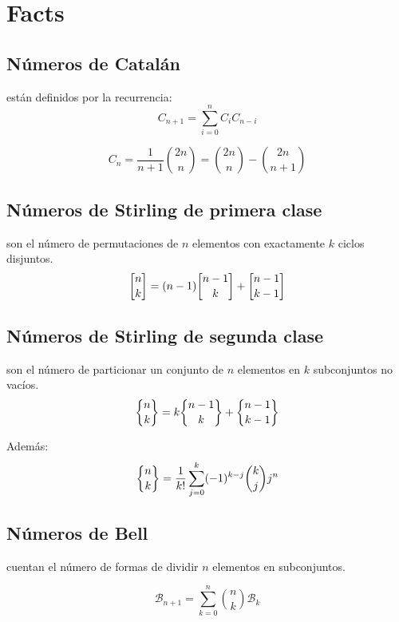 
\section{Facts} 
\subsection{Números de Catal\'an} están definidos por la recurrencia:
\begin{equation*}
  C_{n+1} = \sum_{i=0}^nC_iC_{n-i}
\end{equation*}

\begin{equation*}
  C_n = \frac{1}{n+1}\binom{2n}{n} = \binom{2n}{n} - \binom{2n}{n+1}
\end{equation*}

\subsection{Números de Stirling de primera clase} son el número de permutaciones de $n$ elementos con exactamente $k$ ciclos disjuntos.
\begin{equation*}
  \stirlingfirst{n}{k} = (n-1)\stirlingfirst{n-1}{k} + \stirlingfirst{n-1}{k-1}
\end{equation*}

\subsection{Números de Stirling de segunda clase} son el número de particionar un conjunto de
$n$ elementos en $k$ subconjuntos no vacíos.
\begin{equation*}
  \stirlingsecond{n}{k} = k\stirlingsecond{n-1}{k} + \stirlingsecond{n-1}{k-1}
\end{equation*}

Además:
\begin{equation*}
  \stirlingsecond{n}{k} = \frac{1}{k!}\sum_{j=0}^k (-1)^{k-j} \binom{k}{j} j^n
\end{equation*}
\newpage
\subsection{Números de Bell} cuentan el número de formas de dividir $n$ elementos en subconjuntos.

\begin{equation*}
  \mathcal{B}_{n+1} = \sum_{k=0}^n \binom{n}{k} \mathcal{B}_k
\end{equation*}

